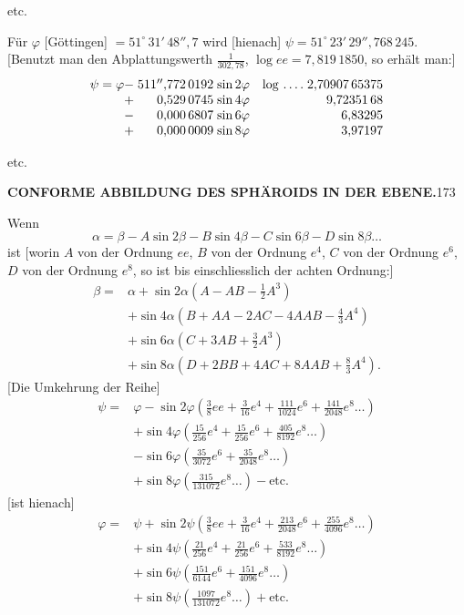 {\centering etc.\par}
Für \(\varphi\) [Göttingen] \(=51^\circ\,31'\,48''{,}7\) wird [hienach] \(\psi=51^\circ\,23'\,29''{,}768\,245\).
[Benutzt man den Abplattungswerth \(\frac1{302{,}78}\), \(\log ee=7{,}819\,1850\), so erhält man:]
\[
\begin{array}{@{}r@{\;}r@{\;}l@{\quad}l@{\;}r@{}}
\psi=\varphi-&511''{,}772\,0192&\sin2\varphi&\log\,.\,.\,.\,.&2{,}70907\,65375\\
+&0{,}529\,0745&\sin4\varphi&&9{,}72351\,68\\
-&0{,}000\,6807&\sin6\varphi&&6{,}83295\\
+&0{,}000\,0009&\sin8\varphi&&3{,}97197
\end{array}
\]
{\centering etc.\par}

\par\clearpage
\noindent\null\hfill{\small\textbf{CONFORME ABBILDUNG DES SPHÄROIDS IN DER EBENE.}}\hfill173\par\medskip
{\centering [22.]\par}
Wenn
\[\alpha=\beta-A\sin2\beta-B\sin4\beta-C\sin6\beta-D\sin8\beta\ldots\]
\noindent ist [worin \(A\) von der Ordnung \(ee\), \(B\) von der Ordnung \(e^4\), \(C\) von der Ordnung \(e^6\), \(D\) von der Ordnung \(e^8\), so ist bis einschliesslich der achten Ordnung:]
\[
\begin{aligned}
\beta={}&\alpha+\sin2\alpha(A-AB-\tfrac12A^3)\\
&+\sin4\alpha(B+AA-2AC-4AAB-\tfrac43A^4)\\
&+\sin6\alpha(C+3AB+\tfrac32A^3)\\
&+\sin8\alpha(D+2BB+4AC+8AAB+\tfrac83A^4).
\end{aligned}
\]
[Die Umkehrung der Reihe]
\[
\begin{aligned}
\psi={}&\varphi-\sin2\varphi(\tfrac38ee+\tfrac3{16}e^4+\tfrac{111}{1024}e^6+\tfrac{141}{2048}e^8\ldots)\\
&+\sin4\varphi(\tfrac{15}{256}e^4+\tfrac{15}{256}e^6+\tfrac{405}{8192}e^8\ldots)\\
&-\sin6\varphi(\tfrac{35}{3072}e^6+\tfrac{35}{2048}e^8\ldots)\\
&+\sin8\varphi(\tfrac{315}{131072}e^8\ldots)-\text{etc.}
\end{aligned}
\]
[ist hienach]
\[
\begin{aligned}
\varphi={}&\psi+\sin2\psi(\tfrac38ee+\tfrac3{16}e^4+\tfrac{213}{2048}e^6+\tfrac{255}{4096}e^8\ldots)\\
&+\sin4\psi(\tfrac{21}{256}e^4+\tfrac{21}{256}e^6+\tfrac{533}{8192}e^8\ldots)\\
&+\sin6\psi(\tfrac{151}{6144}e^6+\tfrac{151}{4096}e^8\ldots)\\
&+\sin8\psi(\tfrac{1097}{131072}e^8\ldots)+\text{etc.}
\end{aligned}
\]
